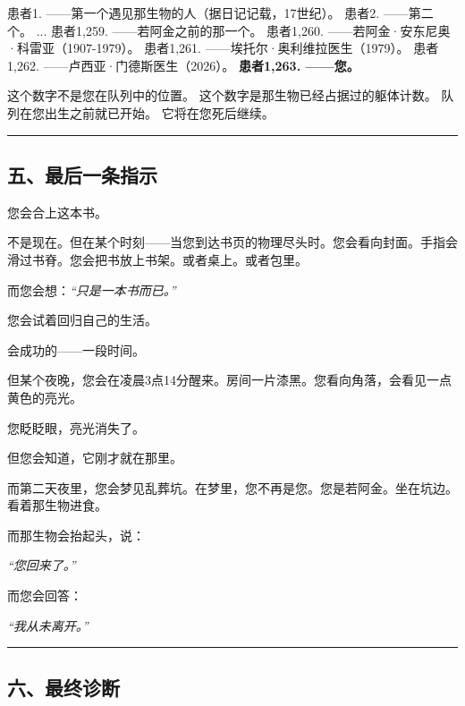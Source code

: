 \noindent 患者1. ——第一个遇见那生物的人（据日记记载，17世纪）。
\noindent 患者2. ——第二个。
\noindent ...
\noindent 患者1,259. ——若阿金之前的那一个。
\noindent 患者1,260. ——若阿金·安东尼奥·科雷亚（1907-1979）。
\noindent 患者1,261. ——埃托尔·奥利维拉医生（1979）。
\noindent 患者1,262. ——卢西亚·门德斯医生（2026）。
\noindent \textbf{患者1,263. ——您。}

\noindent 这个数字不是您在队列中的位置。
\noindent 这个数字是那生物已经占据过的躯体计数。
\noindent 队列在您出生之前就已开始。
\noindent 它将在您死后继续。

\vspace{0.5em}\noindent\rule{\textwidth}{0.5pt}\vspace{0.5em}

\subsection*{五、最后一条指示}

\noindent 您会合上这本书。

\noindent 不是现在。但在某个时刻——当您到达书页的物理尽头时。您会看向封面。手指会滑过书脊。您会把书放上书架。或者桌上。或者包里。

\noindent 而您会想：\textit{\textquotedblleft{}只是一本书而已。\textquotedblright{}}

\noindent 您会试着回归自己的生活。

\noindent 会成功的——一段时间。

\noindent 但某个夜晚，您会在凌晨3点14分醒来。房间一片漆黑。您看向角落，会看见一点黄色的亮光。

\noindent 您眨眨眼，亮光消失了。

\noindent 但您会知道，它刚才就在那里。

\noindent 而第二天夜里，您会梦见乱葬坑。在梦里，您不再是您。您是若阿金。坐在坑边。看着那生物进食。

\noindent 而那生物会抬起头，说：

\noindent \textit{\textquotedblleft{}您回来了。\textquotedblright{}}

\noindent 而您会回答：

\noindent \textit{\textquotedblleft{}我从未离开。\textquotedblright{}}

\vspace{0.5em}\noindent\rule{\textwidth}{0.5pt}\vspace{0.5em}

\subsection*{六、最终诊断}


